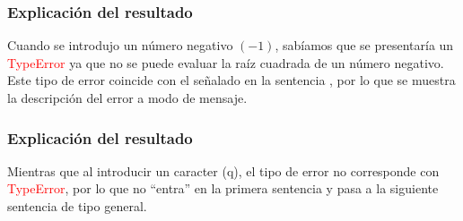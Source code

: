 \begin{frame}
\frametitle{Explicación del resultado}
Cuando se introdujo un número negativo $(-1)$, sabíamos que se presentaría un \textcolor{red}{TypeError} ya que no se puede evaluar la raíz cuadrada de un número negativo.
\\
\bigskip
\pause
Este tipo de error coincide con el señalado en la sentencia , por lo que se muestra la descripción del error a modo de mensaje.
\end{frame}
\begin{frame}
\frametitle{Explicación del resultado}
Mientras que al introducir un caracter (q), el tipo de error no corresponde con \textcolor{red}{TypeError}, por lo que no \enquote{entra} en la primera sentencia  y pasa a la siguiente sentencia  de tipo general.
\end{frame}

